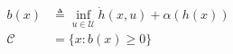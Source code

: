 \documentclass[preview]{standalone}
\begin{document}
\begin{align*}
b(x) &\triangleq \inf_{u \in \mathcal{U}} \dot h(x, u) + \alpha(h(x))\\ \mathcal{C} &= \{ x : b(x) \geq 0 \}
\end{align*}
\end{document}
